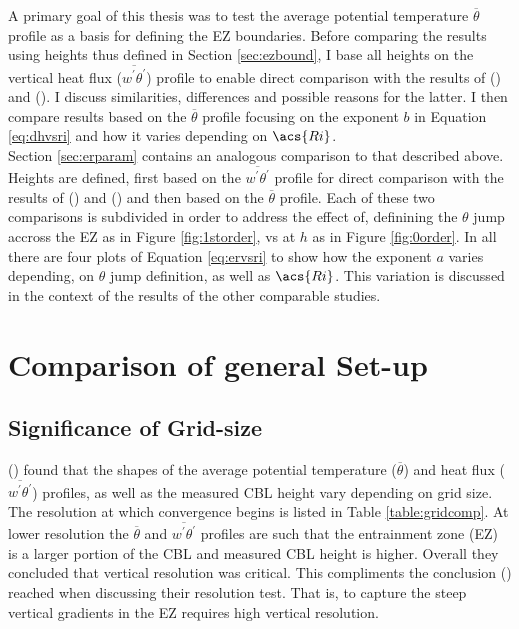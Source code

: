 A primary goal of this thesis was to test the average potential temperature $\overline{\theta}$ profile as a basis for defining the \acs{EZ} boundaries.  Before comparing the results using heights thus defined in Section \ref{sec:ezbound}, I base all heights on the vertical heat flux ($\overline{w^{'}\theta^{'}}$) profile to enable direct comparison with the results of \citeauthor{BrooksFowler2} (\citeyear{BrooksFowler2}) and \citeauthor{FedConzMir04} (\citeyear{FedConzMir04}).  I discuss similarities, differences and possible reasons for the latter. I then compare results based on the $\overline{\theta}$ profile focusing on the exponent $b$ in Equation \ref{eq:dhvsri} and how it varies depending on $\acs{Ri}$.\\


Section \ref{sec:erparam} contains an analogous comparison to that described above.  Heights are defined, first based on the $\overline{w^{'}\theta^{'}}$ profile for direct comparison with the results of \citeauthor{FedConzMir04} (\citeyear{FedConzMir04}) and \citeauthor{GarciaMellado} (\citeyear{GarciaMellado}) and then based on the $\overline{\theta}$ profile.  Each of these two comparisons is subdivided in order to address the effect of, definining the $\theta$ jump accross the \acs{EZ} as in Figure \ref{fig:1storder}, vs at $h$ as in Figure \ref{fig:0order}.  In all there are four plots of Equation \ref{eq:ervsri} to show how the exponent $a$ varies depending, on $\theta$ jump definition, as well as $\acs{Ri}$.  This variation is discussed in the context of the results of the other comparable studies.\\          

\section{Comparison of general Set-up}
\label{sec:gensetup}
\FloatBarrier

\subsection{Significance of Grid-size}
\label{subsec:gridsize}
\citeauthor{SullPat} (\citeyear{SullPat}) found that the shapes of the average potential temperature ($\overline{\theta}$) and heat flux ($\overline{w^{'}\theta^{'}}$) profiles, as well as the measured \acs{CBL} height vary depending on grid size.  The resolution at which convergence begins is listed in Table \ref{table:gridcomp}.  At lower resolution the $\overline{\theta}$ and $\overline{w^{'}\theta^{'}}$ profiles are such that the entrainment zone (\acs{EZ}) is a larger portion of the \acs{CBL} and measured \acs{CBL} height is higher.  Overall they concluded that vertical resolution was critical.  This compliments the conclusion \citeauthor{BrooksFowler2} (\citeyear{BrooksFowler2}) reached when discussing their resolution test.  That is, to capture the steep vertical gradients in the \acs{EZ} requires high vertical resolution. \\

